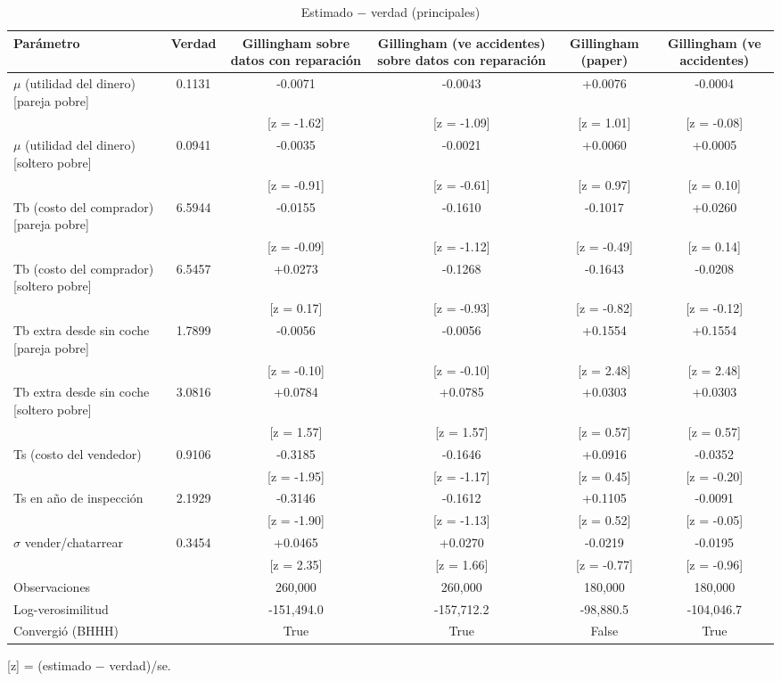 \begin{table}[htbp]
\centering
\caption{Estimado $-$ verdad (principales)}
\begin{tabular}{lccccc}
\toprule
Parámetro & Verdad & Gillingham sobre datos con reparación & Gillingham (ve accidentes) sobre datos con reparación & Gillingham (paper) & Gillingham (ve accidentes) \\
\midrule
$\mu$ (utilidad del dinero) [pareja pobre] & 0.1131 & -0.0071 & -0.0043 & +0.0076 & -0.0004 \\
 &  & [z = -1.62] & [z = -1.09] & [z = 1.01] & [z = -0.08] \\
$\mu$ (utilidad del dinero) [soltero pobre] & 0.0941 & -0.0035 & -0.0021 & +0.0060 & +0.0005 \\
 &  & [z = -0.91] & [z = -0.61] & [z = 0.97] & [z = 0.10] \\
Tb (costo del comprador) [pareja pobre] & 6.5944 & -0.0155 & -0.1610 & -0.1017 & +0.0260 \\
 &  & [z = -0.09] & [z = -1.12] & [z = -0.49] & [z = 0.14] \\
Tb (costo del comprador) [soltero pobre] & 6.5457 & +0.0273 & -0.1268 & -0.1643 & -0.0208 \\
 &  & [z = 0.17] & [z = -0.93] & [z = -0.82] & [z = -0.12] \\
Tb extra desde sin coche [pareja pobre] & 1.7899 & -0.0056 & -0.0056 & +0.1554 & +0.1554 \\
 &  & [z = -0.10] & [z = -0.10] & [z = 2.48] & [z = 2.48] \\
Tb extra desde sin coche [soltero pobre] & 3.0816 & +0.0784 & +0.0785 & +0.0303 & +0.0303 \\
 &  & [z = 1.57] & [z = 1.57] & [z = 0.57] & [z = 0.57] \\
Ts (costo del vendedor) & 0.9106 & -0.3185 & -0.1646 & +0.0916 & -0.0352 \\
 &  & [z = -1.95] & [z = -1.17] & [z = 0.45] & [z = -0.20] \\
Ts en año de inspección & 2.1929 & -0.3146 & -0.1612 & +0.1105 & -0.0091 \\
 &  & [z = -1.90] & [z = -1.13] & [z = 0.52] & [z = -0.05] \\
$\sigma$ vender/chatarrear & 0.3454 & +0.0465 & +0.0270 & -0.0219 & -0.0195 \\
 &  & [z = 2.35] & [z = 1.66] & [z = -0.77] & [z = -0.96] \\
Observaciones &  & 260,000 & 260,000 & 180,000 & 180,000 \\
Log-verosimilitud &  & -151,494.0 & -157,712.2 & -98,880.5 & -104,046.7 \\
Convergió (BHHH) &  & True & True & False & True \\
\bottomrule
\end{tabular}
\par\smallskip\footnotesize [z] = (estimado $-$ verdad)/se.
\end{table}
